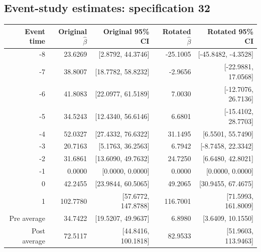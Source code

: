 \documentclass[10pt]{article}
\begin{document}
\subsection*{Event-study estimates: specification 32}
\begin{center}\scriptsize
\begin{tabular}{r rr rr}
\toprule
Event time & Original $\hat\beta$ & Original 95\% CI & Rotated $\hat\beta$ & Rotated 95\% CI \\
\midrule
-8 & 23.6269 & [2.8792, 44.3746] & -25.1005 & [-45.8482, -4.3528] \\
-7 & 38.8007 & [18.7782, 58.8232] & -2.9656 & [-22.9881, 17.0568] \\
-6 & 41.8083 & [22.0977, 61.5189] & 7.0030 & [-12.7076, 26.7136] \\
-5 & 34.5243 & [12.4340, 56.6146] & 6.6801 & [-15.4102, 28.7703] \\
-4 & 52.0327 & [27.4332, 76.6322] & 31.1495 & [6.5501, 55.7490] \\
-3 & 20.7163 & [5.1763, 36.2563] & 6.7942 & [-8.7458, 22.3342] \\
-2 & 31.6861 & [13.6090, 49.7632] & 24.7250 & [6.6480, 42.8021] \\
-1 & 0.0000 & [0.0000, 0.0000] & 0.0000 & [0.0000, 0.0000] \\
0 & 42.2455 & [23.9844, 60.5065] & 49.2065 & [30.9455, 67.4675] \\
1 & 102.7780 & [57.6772, 147.8788] & 116.7001 & [71.5993, 161.8009] \\
\midrule
Pre average & 34.7422 & [19.5207, 49.9637] & 6.8980 & [3.6409, 10.1550] \\
Post average & 72.5117 & [44.8416, 100.1818] & 82.9533 & [51.9603, 113.9463] \\
\bottomrule
\end{tabular}
\end{center}
\clearpage
\end{document}
